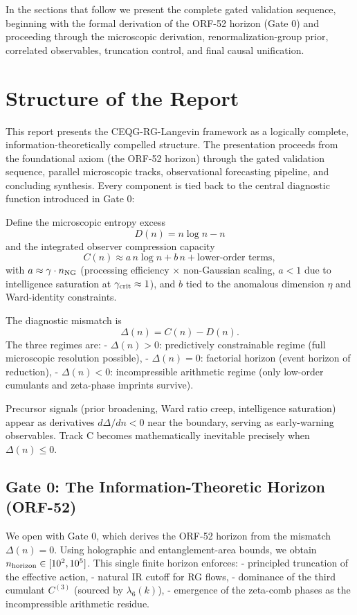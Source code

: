 \documentclass[11pt,a4paper,twoside]{article}
\begin{document}
In the sections that follow we present the complete gated validation sequence, beginning with the formal derivation of the ORF-52 horizon (Gate 0) and proceeding through the microscopic derivation, renormalization-group prior, correlated observables, truncation control, and final causal unification.

\section{Structure of the Report}

This report presents the CEQG-RG-Langevin framework as a logically complete, information-theoretically compelled structure. The presentation proceeds from the foundational axiom (the ORF-52 horizon) through the gated validation sequence, parallel microscopic tracks, observational forecasting pipeline, and concluding synthesis. Every component is tied back to the central diagnostic function introduced in Gate 0:

Define the microscopic entropy excess  
\[ D(n) = n \log n - n \]  
and the integrated observer compression capacity  
\[ C(n) \approx a \, n \log n + b \, n + \text{lower-order terms}, \]  
with $a \approx \gamma \cdot n_{\rm NG}$ (processing efficiency × non-Gaussian scaling, $a < 1$ due to intelligence saturation at $\gamma_{\rm crit} \approx 1$), and $b$ tied to the anomalous dimension $\eta$ and Ward-identity constraints.  

The diagnostic mismatch is  
\[ \Delta(n) = C(n) - D(n). \]  
The three regimes are:  
- $\Delta(n) > 0$: predictively constrainable regime (full microscopic resolution possible),  
- $\Delta(n) = 0$: factorial horizon (event horizon of reduction),  
- $\Delta(n) < 0$: incompressible arithmetic regime (only low-order cumulants and zeta-phase imprints survive).  

Precursor signals (prior broadening, Ward ratio creep, intelligence saturation) appear as derivatives $d\Delta/dn < 0$ near the boundary, serving as early-warning observables. Track C becomes mathematically inevitable precisely when $\Delta(n) \le 0$.

\subsection{Gate 0: The Information-Theoretic Horizon (ORF-52)}
We open with Gate 0, which derives the ORF-52 horizon from the mismatch $\Delta(n) = 0$. Using holographic and entanglement-area bounds, we obtain $n_{\rm horizon} \in [10^2, 10^5]$. This single finite horizon enforces:  
- principled truncation of the effective action,  
- natural IR cutoff for RG flows,  
- dominance of the third cumulant $C^{(3)}$ (sourced by $\lambda_6(k)$),  
- emergence of the zeta-comb phases as the incompressible arithmetic residue.  
\end{document}
